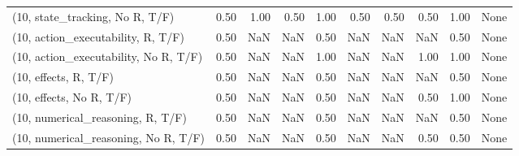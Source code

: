 \begin{table*}[h!]
\begin{adjustbox}{width=2\columnwidth,center}
\begin{tabular}{lrrr|rrr|rrr}
(10, state\_tracking, No R, T/F)       &                      0.50 &                  1.00 &                      0.50 &                          1.00 &                      0.50 &                          0.50 &                                   0.50 &                               1.00 &                                  None \\
(10, action\_executability, R, T/F)    &                      0.50 &                   NaN &                       NaN &                          0.50 &                       NaN &                           NaN &                                    NaN &                               0.50 &                                  None \\
(10, action\_executability, No R, T/F) &                      0.50 &                   NaN &                       NaN &                          1.00 &                       NaN &                           NaN &                                   1.00 &                               1.00 &                                  None \\
(10, effects, R, T/F)                 &                      0.50 &                   NaN &                       NaN &                          0.50 &                       NaN &                           NaN &                                    NaN &                               0.50 &                                  None \\
(10, effects, No R, T/F)              &                      0.50 &                   NaN &                       NaN &                          0.50 &                       NaN &                           NaN &                                   0.50 &                               1.00 &                                  None \\
(10, numerical\_reasoning, R, T/F)     &                      0.50 &                   NaN &                       NaN &                          0.50 &                       NaN &                           NaN &                                    NaN &                               0.50 &                                  None \\
(10, numerical\_reasoning, No R, T/F)  &                      0.50 &                   NaN &                       NaN &                          0.50 &                       NaN &                           NaN &                                   0.50 &                               0.50 &                                  None \\

\end{tabular}
\end{adjustbox}
\end{table*}
